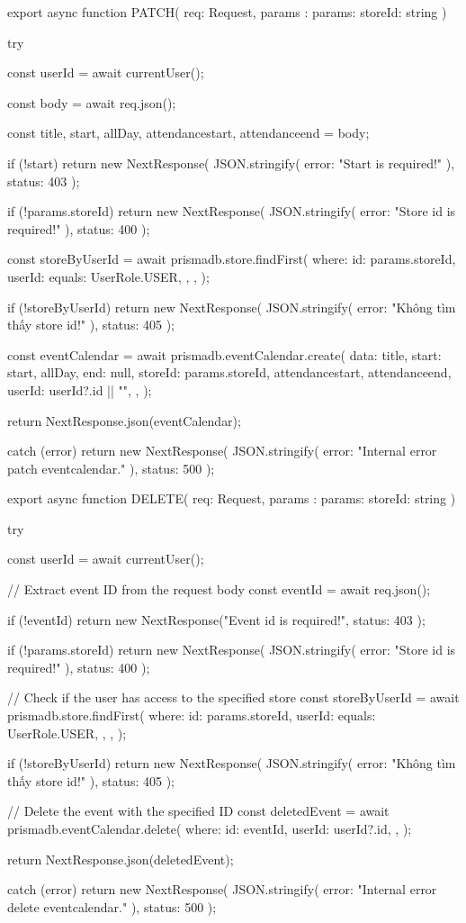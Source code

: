 export async function PATCH(
  req: Request,
  { params }: { params: { storeId: string } }
) {
  try {
    const userId = await currentUser();

    const body = await req.json();

    const { title, start, allDay, attendancestart, attendanceend } = body;

    if (!start) {
      return new NextResponse(
        JSON.stringify({ error: "Start is required!" }),
        { status: 403 }
      );
    }

    if (!params.storeId) {
      return new NextResponse(
        JSON.stringify({ error: "Store id is required!" }),
        { status: 400 }
      );
    }

    const storeByUserId = await prismadb.store.findFirst({
      where: {
        id: params.storeId,
        userId: {
          equals: UserRole.USER,
        },
      },
    });

    if (!storeByUserId) {
      return new NextResponse(
        JSON.stringify({ error: "Không tìm thấy store id!" }),
        { status: 405 }
      );
    }

    const eventCalendar = await prismadb.eventCalendar.create({
      data: {
        title,
        start: start,
        allDay,
        end: null,
        storeId: params.storeId,
        attendancestart,
        attendanceend,
        userId: userId?.id || "",
      },
    });

    return NextResponse.json(eventCalendar);
  } catch (error) {
    return new NextResponse(
      JSON.stringify({ error: "Internal error patch eventcalendar." }),
      { status: 500 }
    );
  }
}

export async function DELETE(
  req: Request,
  { params }: { params: { storeId: string } }
) {
  try {
    const userId = await currentUser();

    // Extract event ID from the request body
    const { eventId } = await req.json();

    if (!eventId) {
      return new NextResponse("Event id is required!", { status: 403 });
    }

    if (!params.storeId) {
      return new NextResponse(
        JSON.stringify({ error: "Store id is required!" }),
        { status: 400 }
      );
    }

    // Check if the user has access to the specified store
    const storeByUserId = await prismadb.store.findFirst({
      where: {
        id: params.storeId,
        userId: {
          equals: UserRole.USER,
        },
      },
    });

    if (!storeByUserId) {
      return new NextResponse(
        JSON.stringify({ error: "Không tìm thấy store id!" }),
        { status: 405 }
      );
    }

    // Delete the event with the specified ID
    const deletedEvent = await prismadb.eventCalendar.delete({
      where: {
        id: eventId,
        userId: userId?.id,
      },
    });
    
      return NextResponse.json(deletedEvent);
  } catch (error) {
    return new NextResponse(
      JSON.stringify({ error: "Internal error delete eventcalendar." }),
      { status: 500 }
    );
  }
}
